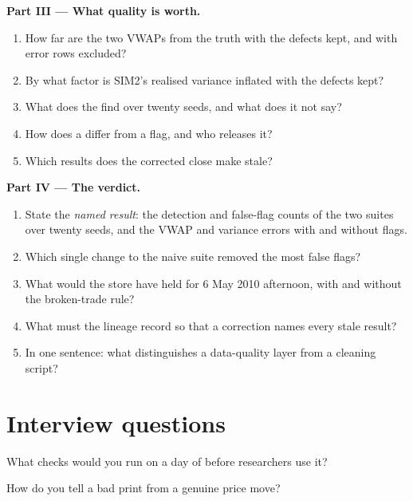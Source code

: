 \begin{problem}
\medskip\noindent\textbf{Part III --- What quality is worth.}
\begin{enumerate}[resume]
\item How far are the two VWAPs from the truth with the defects kept, and with error rows excluded?
\item By what factor is SIM2's realised variance inflated with the defects kept?
\item What does the  find over twenty seeds, and what does it not say?
\item How does a  differ from a flag, and who releases it?
\item Which results does the corrected close make stale?
\end{enumerate}

\medskip\noindent\textbf{Part IV --- The verdict.}
\begin{enumerate}[resume]
\item State the \emph{named result}: the detection and false-flag counts of the two suites over twenty seeds, and the VWAP and variance
errors with and without flags.
\item Which single change to the naive suite removed the most false flags?
\item What would the store have held for 6 May 2010 afternoon, with and without the broken-trade rule?
\item What must the lineage record so that a correction names every stale result?
\item In one sentence: what distinguishes a data-quality layer from a cleaning script?
\end{enumerate}
\end{problem}

\section{Interview questions}

\begin{interviewq}\label{iq:pl:data-quality-and-lineage:1}
What checks would you run on a day of  before researchers use it?
\end{interviewq}

\begin{interviewq}\label{iq:pl:data-quality-and-lineage:2}
How do you tell a bad print from a genuine price move?
\end{interviewq}

